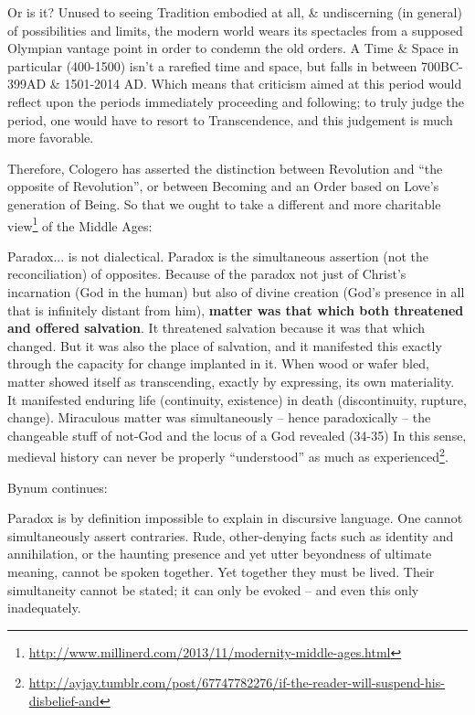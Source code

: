 Or is it? Unused to seeing Tradition embodied at all, \& undiscerning (in general) of possibilities and limits, the modern world wears its spectacles from a supposed Olympian vantage point in order to condemn the old orders. A Time \& Space in particular (400-1500) isn't a rarefied time and space, but falls in between 700BC-399AD \& 1501-2014 AD. Which means that criticism aimed at this period would reflect upon the periods immediately proceeding and following; to truly judge the period, one would have to resort to Transcendence, and this judgement is much more favorable.

Therefore, Cologero has asserted the distinction between Revolution and ``the opposite of Revolution'', or between Becoming and an Order based on Love's generation of Being. So that we ought to take a different and more charitable view\footnote{\url{http://www.millinerd.com/2013/11/modernity-middle-ages.html}} of the Middle Ages:

\begin{quotex}
Paradox... is not dialectical. Paradox is the simultaneous assertion (not the reconciliation) of opposites. Because of the paradox not just of Christ's incarnation (God in the human) but also of divine creation (God's presence in all that is infinitely distant from him), \textbf{matter was that which both threatened and offered salvation}. It threatened salvation because it was that which changed. But it was also the place of salvation, and it manifested this exactly through the capacity for change implanted in it. When wood or wafer bled, matter showed itself as transcending, exactly by expressing, its own materiality. It manifested enduring life (continuity, existence) in death (discontinuity, rupture, change). Miraculous matter was simultaneously -- hence paradoxically -- the changeable stuff of not-God and the locus of a God revealed (34-35) In this sense, medieval history can never be properly ``understood'' as much as experienced\footnote{\url{http://ayjay.tumblr.com/post/67747782276/if-the-reader-will-suspend-his-disbelief-and}}.
\end{quotex}


Bynum continues:

\begin{quotex}
Paradox is by definition impossible to explain in discursive language. One cannot simultaneously assert contraries. Rude, other-denying facts such as identity and annihilation, or the haunting presence and yet utter beyondness of ultimate meaning, cannot be spoken together. Yet together they must be lived. Their simultaneity cannot be stated; it can only be evoked -- and even this only inadequately.
\end{quotex}


